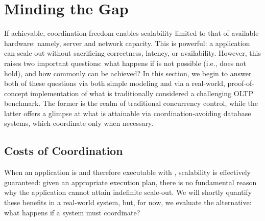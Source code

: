
\section{Minding the Gap}
\label{sec:evaluation}

If achievable, coordination-freedom enables scalability limited to
that of available hardware: namely, server and network capacity. This
is powerful: a \cfree application can scale out without sacrificing
correctness, latency, or availability. However, this raises two
important questions: what happens if \cfreedom is not possible (i.e.,
\iconfluence does not hold), and how commonly can \cfreedom be
achieved? In this section, we begin to answer both of these questions
via both simple modeling and via a real-world, proof-of-concept
implementation of what is traditionally considered a challenging OLTP
benchmark. The former is the realm of traditional concurrency control,
while the latter offers a glimpse at what is attainable via
coordination-avoiding database systems, which coordinate only when
necessary.

\subsection{Costs of Coordination}

When an application is \iconfluent and therefore executable with
\cfreedom, scalability is effectively guaranteed: given an appropriate
execution plan, there is no fundamental reason why the application
cannot attain indefinite scale-out. We will shortly quantify these
benefits in a real-world system, but, for now, we evaluate the
alternative: what happens if a system must coordinate?

